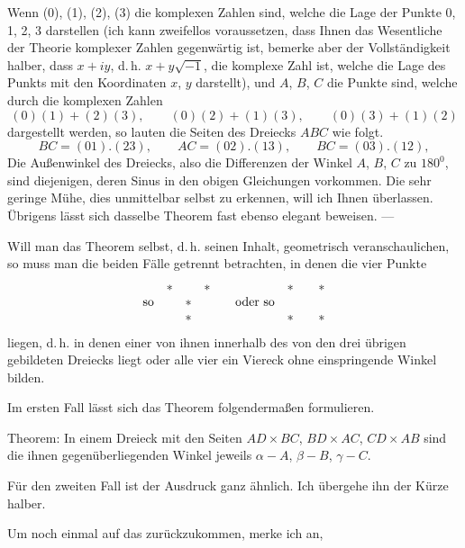 Wenn (0), (1), (2), (3) die komplexen Zahlen sind, welche die Lage der Punkte 0, 1, 2, 3 darstellen (ich kann zweifellos voraussetzen, dass Ihnen das Wesentliche der Theorie komplexer Zahlen gegenwärtig ist, bemerke aber der Vollständigkeit halber, dass $x+iy$, d.\,h. $x+y\sqrt{-1}$, die komplexe Zahl ist, welche die Lage des Punkts mit den Koordinaten $x$, $y$ darstellt), und $A$, $B$, $C$ die Punkte sind, welche durch die komplexen Zahlen
\[
(0)(1)+(2)(3),\qquad (0)(2)+(1)(3),\qquad (0)(3)+(1)(2)
\]
dargestellt werden, so lauten die Seiten des Dreiecks $ABC$ wie folgt.
\[
BC=(01).(23),\qquad AC=(02).(13),\qquad BC=(03).(12), \]
Die Außenwinkel des Dreiecks, also die Differenzen der Winkel $A$, $B$, $C$ zu $180^0$, sind diejenigen, deren Sinus in den obigen Gleichungen vorkommen. Die sehr geringe Mühe, dies unmittelbar selbst zu erkennen, will ich Ihnen überlassen. Übrigens lässt sich dasselbe Theorem fast ebenso elegant  beweisen. —

Will man das Theorem selbst, d.\,h. seinen Inhalt, geometrisch veranschaulichen, so muss man die beiden Fälle getrennt betrachten, in denen die vier Punkte
\[
\begin{array}{c@{\quad}ccc@{\qquad}c@{\quad}ccc}
 & * & & * & & * & & *\\
\text{so} & & * & & \text{oder so} & & &\\
 & & * & & & * & & *
\end{array}
\]
liegen, d.\,h. in denen einer von ihnen innerhalb des von den drei übrigen gebildeten Dreiecks liegt oder alle vier ein Viereck ohne einspringende Winkel bilden.

Im ersten Fall lässt sich das Theorem folgendermaßen formulieren.

Theorem: In einem Dreieck mit den Seiten $AD\times BC$, $BD\times AC$, $CD\times AB$ sind die ihnen gegenüberliegenden Winkel jeweils $\alpha-A$, $\beta-B$, $\gamma-C$.

\begin{center}\end{center}

Für den zweiten Fall ist der Ausdruck ganz ähnlich. Ich übergehe ihn der Kürze halber.

Um noch einmal auf das  zurückzukommen, merke ich an,\space%
